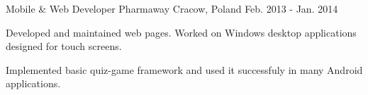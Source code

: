 \begin{cventries}
  \cventry
    {Mobile \& Web Developer} %
    {Pharmaway} %
    {Cracow, Poland} %
    {Feb. 2013 - Jan. 2014} %
    {
      \begin{cvitems} %
        \item {Developed and maintained web pages. Worked on Windows desktop applications designed for touch screens.}
        \item {Implemented basic quiz-game framework and used it successfuly in many Android applications.}
      \end{cvitems}
    }

\end{cventries}
